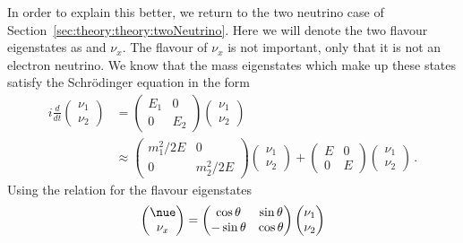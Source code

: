 In order to explain this better, we return to the two neutrino case of Section~\ref{sec:theory:theory:twoNeutrino}.
Here we will denote the two flavour eigenstates as \nue and $\nu_{x}$.
The flavour of $\nu_{x}$ is not important, only that it is not an electron neutrino.
We know that the mass eigenstates which make up these states satisfy the Schr\"odinger equation in the form
\begin{align}
  i \frac{d}{dt}
  \begin{pmatrix}
    \nu_{1} \\
    \nu_{2}
  \end{pmatrix}
  &=
  \begin{pmatrix}
    E_{1} & 0 \\
    0     & E_{2}
  \end{pmatrix}
  \begin{pmatrix}
    \nu_{1} \\
    \nu_{2}
  \end{pmatrix} \\
  & \approx
  \begin{pmatrix}
    m_{1}^{2}/2E & 0 \\
    0 & m_{2}^{2}/2E
  \end{pmatrix}
  \begin{pmatrix}
    \nu_{1} \\
    \nu_{2}
  \end{pmatrix}
  +
  \begin{pmatrix}
    E & 0 \\
    0 & E 
  \end{pmatrix}
  \begin{pmatrix}
    \nu_{1} \\
    \nu_{2}
  \end{pmatrix} \, .  
\end{align}
Using the relation for the flavour eigenstates
\begin{equation}
  \begin{pmatrix}
    \nue \\
    \nu_{x}
  \end{pmatrix}
  =
  \begin{pmatrix}
    \cos\theta & \sin\theta \\
    -\sin\theta & \cos\theta
  \end{pmatrix}
  \begin{pmatrix}
    \nu_{1} \\
    \nu_{2}
  \end{pmatrix}
\end{equation}
